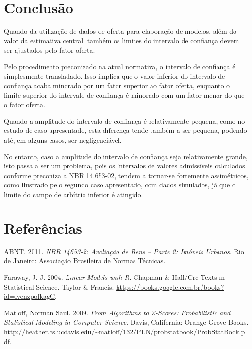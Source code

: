 \documentclass{article}
\begin{document}
\hypertarget{conclusuxe3o}{%
\section{Conclusão}\label{conclusuxe3o}}

Quando da utilização de dados de oferta para elaboração de modelos, além
do valor da estimativa central, também os limites do intervalo de
confiança devem ser ajustados pelo fator oferta.

Pelo procedimento preconizado na atual normativa, o intervalo de
confiança é simplesmente transladado. Isso implica que o valor inferior
do intervalo de confiança acaba minorado por um fator superior ao fator
oferta, enquanto o limite superior do intervalo de confiança é minorado
com um fator menor do que o fator oferta.

Quando a amplitude do intervalo de confiança é relativamente pequena,
como no estudo de caso apresentado, esta diferença tende também a ser
pequena, podendo até, em alguns casos, ser negligenciável.

No entanto, caso a amplitude do intervalo de confiança seja
relativamente grande, isto passa a ser um problema, pois os intervalos
de valores admissíveis calculados conforme preconiza a NBR 14.653-02,
tendem a tornar-se fortemente assimétricos, como ilustrado pelo segundo
caso apresentado, com dados simulados, já que o limite do campo de
arbítrio inferior é atingido.

\hypertarget{referuxeancias}{%
\section*{Referências}\label{referuxeancias}}

\hypertarget{refs}{}
\leavevmode\hypertarget{ref-NBR1465302}{}%
ABNT. 2011. \emph{NBR 14653-2: Avaliação de Bens -- Parte 2: Imóveis
Urbanos}. Rio de Janeiro: Associação Brasileira de Normas Técnicas.

\leavevmode\hypertarget{ref-faraway2004linear}{}%
Faraway, J. J. 2004. \emph{Linear Models with R}. Chapman \& Hall/Crc
Texts in Statistical Science. Taylor \& Francis.
\url{https://books.google.com.br/books?id=fvenzpofkagC}.

\leavevmode\hypertarget{ref-matloff2009}{}%
Matloff, Norman Saul. 2009. \emph{From Algorithms to Z-Scores:
Probabilistic and Statistical Modeling in Computer Science}. Davis,
California: Orange Grove Books.
\url{http://heather.cs.ucdavis.edu/~matloff/132/PLN/probstatbook/ProbStatBook.pdf}.



\end{document}
